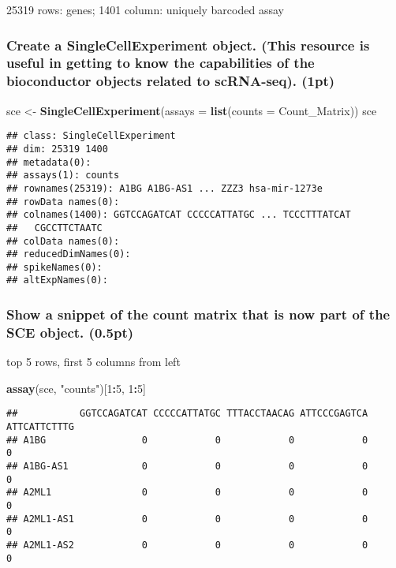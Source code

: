 \documentclass[]{article}
\newenvironment{Shaded}{\begin{snugshade}}{\end{snugshade}}
\newcommand{\KeywordTok}[1]{\textcolor[rgb]{0.13,0.29,0.53}{\textbf{#1}}}
\newcommand{\DataTypeTok}[1]{\textcolor[rgb]{0.13,0.29,0.53}{#1}}
\newcommand{\DecValTok}[1]{\textcolor[rgb]{0.00,0.00,0.81}{#1}}
\newcommand{\StringTok}[1]{\textcolor[rgb]{0.31,0.60,0.02}{#1}}
\newcommand{\OperatorTok}[1]{\textcolor[rgb]{0.81,0.36,0.00}{\textbf{#1}}}
\newcommand{\NormalTok}[1]{#1}
\begin{document}
25319 rows: genes; 1401 column: uniquely barcoded assay

\subsubsection{Create a SingleCellExperiment object. (This resource is
useful in getting to know the capabilities of the bioconductor objects
related to scRNA-seq).
(1pt)}\label{create-a-singlecellexperiment-object.-this-resource-is-useful-in-getting-to-know-the-capabilities-of-the-bioconductor-objects-related-to-scrna-seq.-1pt}

\begin{Shaded}
\begin{Highlighting}[]
\NormalTok{sce <-}\StringTok{ }\KeywordTok{SingleCellExperiment}\NormalTok{(}\DataTypeTok{assays =} \KeywordTok{list}\NormalTok{(}\DataTypeTok{counts =}\NormalTok{ Count_Matrix))}
\NormalTok{sce}
\end{Highlighting}
\end{Shaded}

\begin{verbatim}
## class: SingleCellExperiment 
## dim: 25319 1400 
## metadata(0):
## assays(1): counts
## rownames(25319): A1BG A1BG-AS1 ... ZZZ3 hsa-mir-1273e
## rowData names(0):
## colnames(1400): GGTCCAGATCAT CCCCCATTATGC ... TCCCTTTATCAT
##   CGCCTTCTAATC
## colData names(0):
## reducedDimNames(0):
## spikeNames(0):
## altExpNames(0):
\end{verbatim}

\subsubsection{Show a snippet of the count matrix that is now part of
the SCE object.
(0.5pt)}\label{show-a-snippet-of-the-count-matrix-that-is-now-part-of-the-sce-object.-0.5pt}

top 5 rows, first 5 columns from left

\begin{Shaded}
\begin{Highlighting}[]
\KeywordTok{assay}\NormalTok{(sce, }\StringTok{"counts"}\NormalTok{)[}\DecValTok{1}\OperatorTok{:}\DecValTok{5}\NormalTok{, }\DecValTok{1}\OperatorTok{:}\DecValTok{5}\NormalTok{]}
\end{Highlighting}
\end{Shaded}

\begin{verbatim}
##           GGTCCAGATCAT CCCCCATTATGC TTTACCTAACAG ATTCCCGAGTCA ATTCATTCTTTG
## A1BG                 0            0            0            0            0
## A1BG-AS1             0            0            0            0            0
## A2ML1                0            0            0            0            0
## A2ML1-AS1            0            0            0            0            0
## A2ML1-AS2            0            0            0            0            0
\end{verbatim}
\end{document}
